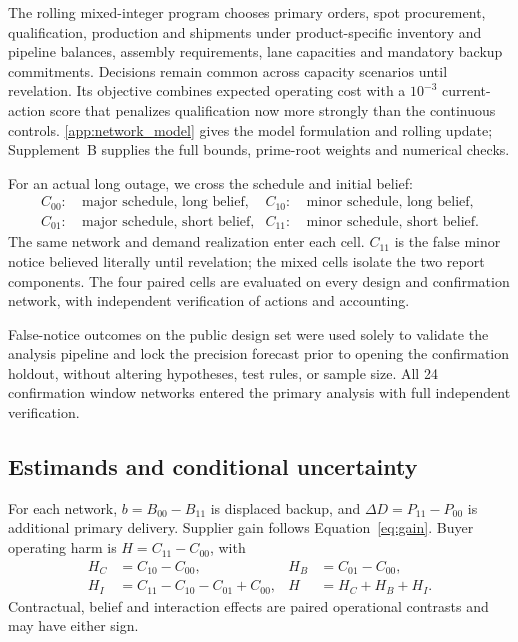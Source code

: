 \documentclass[preprint,11pt,authoryear]{elsarticle}
\begin{document}
The rolling mixed-integer program chooses primary orders, spot procurement, qualification, production and shipments under product-specific inventory and pipeline balances, assembly requirements, lane capacities and mandatory backup commitments. Decisions remain common across capacity scenarios until revelation. Its objective combines expected operating cost with a $10^{-3}$ current-action score that penalizes qualification now more strongly than the continuous controls. \ref{app:network_model} gives the model formulation and rolling update; Supplement~B supplies the full bounds, prime-root weights and numerical checks.

For an actual long outage, we cross the schedule and initial belief:
\begin{align*}
 C_{00}:&\ \text{major schedule, long belief},&
 C_{10}:&\ \text{minor schedule, long belief},\\
 C_{01}:&\ \text{major schedule, short belief},&
 C_{11}:&\ \text{minor schedule, short belief}.
\end{align*}
The same network and demand realization enter each cell. $C_{11}$ is the false minor notice believed literally until revelation; the mixed cells isolate the two report components. The four paired cells are evaluated on every design and confirmation network, with independent verification of actions and accounting.

False-notice outcomes on the public design set were used solely to validate the analysis pipeline and lock the precision forecast prior to opening the confirmation holdout, without altering hypotheses, test rules, or sample size. All 24 confirmation window networks entered the primary analysis with full independent verification.

\subsection{Estimands and conditional uncertainty}\label{sec:estimands}
For each network, $b=B_{00}-B_{11}$ is displaced backup, and $\Delta D=P_{11}-P_{00}$ is additional primary delivery. Supplier gain follows Equation~\eqref{eq:gain}. Buyer operating harm is $H=C_{11}-C_{00}$, with
\begin{align}
 H_C&=C_{10}-C_{00}, &H_B&=C_{01}-C_{00},\nonumber\\
 H_I&=C_{11}-C_{10}-C_{01}+C_{00}, &H&=H_C+H_B+H_I.\label{eq:channels}
\end{align}
Contractual, belief and interaction effects are paired operational contrasts and may have either sign.
\end{document}
